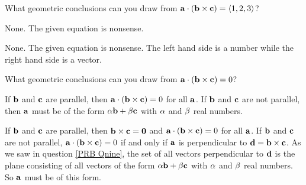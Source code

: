 \begin{question}
What geometric conclusions can you draw from
$\mathbf{a}\cdot(\mathbf{b}\times\mathbf{c})=\left< 1,2,3\right>$?
\end{question}


\begin{answer}
None. The given equation is nonsense.
\end{answer}

\begin{solution}
None. The given equation is nonsense. The left hand side is
a number while the right hand side is a vector.
\end{solution}

\begin{question}
What geometric conclusions can you draw from
$\mathbf{a}\cdot(\mathbf{b}\times\mathbf{c})=0$?
\end{question}


\begin{answer}
If $\mathbf{b}$ and $\mathbf{c}$ are parallel, then $\mathbf{a}\cdot(\mathbf{b}\times\mathbf{c})=0$ for all $\mathbf{a}$.
If $\mathbf{b}$ and $\mathbf{c}$ are not parallel, then $\mathbf{a}$ must be of the form  
$\alpha\mathbf{b}+\beta\mathbf{c}$ with $\alpha$ and $\beta$ real numbers.
\end{answer}

\begin{solution}
If $\mathbf{b}$ and $\mathbf{c}$ are parallel, then $\mathbf{b}\times\mathbf{c}=\mathbf{0}$
and $\mathbf{a}\cdot(\mathbf{b}\times\mathbf{c})=0$ for all $\mathbf{a}$.
If $\mathbf{b}$ and $\mathbf{c}$ are not parallel, $\mathbf{a}\cdot(\mathbf{b}\times\mathbf{c})=0$ 
if and only if $\mathbf{a}$ is perpendicular to $\mathbf{d}=\mathbf{b}\times\mathbf{c}$.
As we saw in question \ref{PRB Qnine}, the set of all vectors perpendicular to
$\mathbf{d}$ is the plane consisting of all vectors of the form  
$\alpha\mathbf{b}+\beta\mathbf{c}$ with $\alpha$ and $\beta$ real numbers. So $\mathbf{a}$ must
be of this form.
\end{solution}

